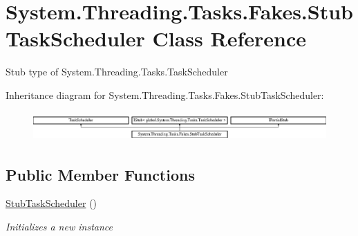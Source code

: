 \hypertarget{class_system_1_1_threading_1_1_tasks_1_1_fakes_1_1_stub_task_scheduler}{\section{System.\-Threading.\-Tasks.\-Fakes.\-Stub\-Task\-Scheduler Class Reference}
\label{class_system_1_1_threading_1_1_tasks_1_1_fakes_1_1_stub_task_scheduler}
}


Stub type of System.\-Threading.\-Tasks.\-Task\-Scheduler 


Inheritance diagram for System.\-Threading.\-Tasks.\-Fakes.\-Stub\-Task\-Scheduler\-:\begin{figure}[H]
\begin{center}
\leavevmode
\includegraphics[height=1.114428cm]{class_system_1_1_threading_1_1_tasks_1_1_fakes_1_1_stub_task_scheduler}
\end{center}
\end{figure}
\subsection*{Public Member Functions}
\begin{DoxyCompactItemize}
\item 
\hyperlink{class_system_1_1_threading_1_1_tasks_1_1_fakes_1_1_stub_task_scheduler_add9de81f97bbd32e78d25f27e94fe96b}{Stub\-Task\-Scheduler} ()
\begin{DoxyCompactList}\small\item\em Initializes a new instance\end{DoxyCompactList}\end{DoxyCompactItemize}
